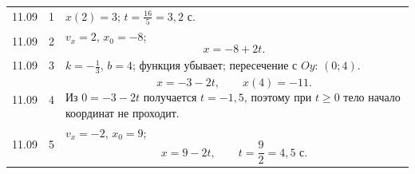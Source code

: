\documentclass[a4paper,12pt]{article}
\begin{document}
\begin{longtable}{@{}p{1.6cm}p{0.8cm}p{\dimexpr\linewidth-3.0cm\relax}@{}}
\midrule

11.09 & 1 &
\(x(2)=3\);
\(\displaystyle t=\frac{16}{5}=3{,}2\text{ с}\). \\

11.09 & 2 &
\(v_x=2\), \(x_0=-8\);
\[
x=-8+2t.
\] \\

11.09 & 3 &
\(\displaystyle k=-\frac13\), \(b=4\); функция убывает; пересечение с \(Oy\): \((0;4)\). \\

11.09 & 4 &
\[
x=-3-2t,\qquad x(4)=-11.
\]
Из \(0=-3-2t\) получается \(t=-1{,}5\), поэтому при \(t\ge0\) тело начало координат не проходит. \\

11.09 & 5 &
\(v_x=-2\), \(x_0=9\);
\[
x=9-2t,
\qquad
t=\frac92=4{,}5\text{ с}.
\] \\

\end{longtable}

\normalsize
\end{document}
